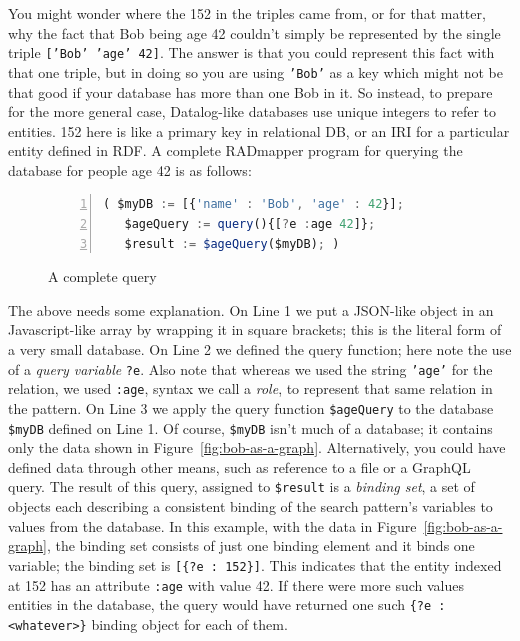 \documentclass[9pt,letterpaper]{article}
\newcommand{\stt}[1]{\texttt{#1}} %
\begin{document}
You might wonder where the 152 in the triples came from, or for that matter, why the fact that Bob being age 42 couldn't
simply be represented by the single triple \stt{['Bob' 'age' 42]}.
The answer is that you could represent this fact with that one triple, but in doing so you are using \stt{'Bob'} as a key
which might not be that good if your database has more than one Bob in it.
So instead, to prepare for the more general case, Datalog-like databases use unique integers to refer to entities.
152 here is like a primary key in relational DB, or an IRI for a particular entity defined in RDF.
A complete RADmapper program for querying the database for people age 42 is as follows:

\begin{figure}[H]
  \caption{A complete query}
  \label{code:bob-age}
\begin{lstlisting}[language=JavaScript,numberstyle=\scriptsize,basicstyle=\ttfamily\scriptsize,numbers=left,stepnumber=1,breaklines=true]
 ( $myDB := [{'name' : 'Bob', 'age' : 42}];
   $ageQuery := query(){[?e :age 42]};
   $result := $ageQuery($myDB); )
\end{lstlisting}
\end{figure} \vspace{-2em}

The above needs some explanation.
On Line 1 we put a JSON-like object in an Javascript-like array by wrapping it in square brackets; this is the literal form of a very small database.
On Line 2 we defined the query function; here note the use of a \textit{query variable} \stt{?e}.
Also note that whereas we used the string \stt{'age'} for the relation, we used \stt{:age}, syntax we call a \textit{role}, to represent that same relation in the pattern.
On Line 3 we apply the query function \stt{\$ageQuery} to the database \stt{\$myDB} defined on Line 1.
Of course, \stt{\$myDB} isn't much of a database; it contains only the data shown in Figure~\ref{fig:bob-as-a-graph}.
Alternatively, you could have defined data through other means, such as reference to a file or a GraphQL query.
The result of this query, assigned to \stt{\$result} is a \textit{binding set}, a set of objects each describing a consistent binding of the search pattern's variables to values from the database.
In this example, with the data in Figure~\ref{fig:bob-as-a-graph}, the binding set consists of just one binding element and it binds one variable; the binding set is \stt{[\{?e : 152\}]}.
This indicates that the entity indexed at 152 has an attribute \stt{:age} with value 42.
If there were more such values entities in the database, the query would have returned one such \stt{\{?e : <whatever>\}}
binding object for each of them.
\end{document}
